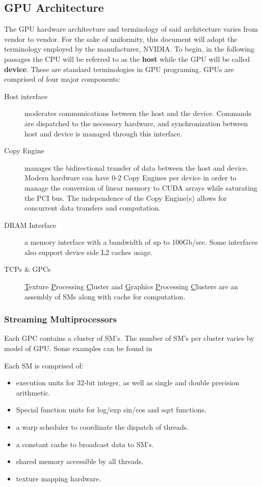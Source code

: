 \subsection{GPU Architecture}
The GPU hardware architecture and terminology of said architecture varies from
vendor to vendor.  For the sake of uniformity, this document will adopt the
terminology employed by the manufacturer, NVIDIA.  To begin, in the following passages the CPU
will be referred to as the \textbf{host} while the GPU will be called \textbf{device}.
These are standard terminologies in GPU programing. GPUs are comprised of four major components:
\begin{description}
  \item[Host interface] moderates communications between the host and the device.
  Commands are dispatched to the necessary hardware, and synchronization between
  host and device is managed through this interface.
  \item[Copy Engine] manages the bidirectional transfer of data between the host
  and device.  Modern hardware can have 0-2 Copy Engines per device in order to
  manage the conversion of linear memory to CUDA arrays while saturating the PCI
  bus.  The independence of the Copy Engine(s) allows for concurrent data transfers
  and computation.
  \item[DRAM Interface] a memory interface with a bandwidth of up to 100Gb/sec.
  Some interfaces also support device side L2 caches usage.
  \item[TCPs \& GPCs] \underline{T}exture \underline{P}rocessing \underline{C}luster
  and \underline{G}raphics \underline{P}rocessing \underline{C}lusters are an assembly
  of \Glspl{SM} along with cache for computation.
\end{description}\cite{Wilt}

\subsubsection{Streaming Multiprocessors}
Each GPC contains a cluster of SM's.  The number of SM's per cluster varies by
model of GPU. Some examples can be found in %


Each SM is comprised of: \cite{Wilt}
\begin{itemize}
  \item execution units for 32-bit integer, as well as single and double precision arithmetic.
  \item Special function units for log/exp sin/cos and sqrt functions.
  \item a warp scheduler to coordinate the dispatch of threads.
  \item a constant cache to broadcast data to SM's.
  \item shared memory accessible by all threads.
  \item texture mapping hardware.
\end{itemize}

